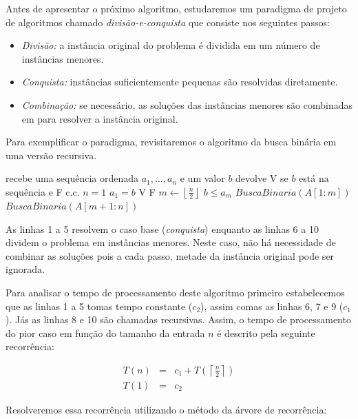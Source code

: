 Antes de apresentar o próximo algoritmo, estudaremos um paradigma de projeto de algoritmos chamado {\em divisão-e-conquista} que consiste nos seguintes passos:

\begin{itemize}
  \item {\em Divisão:} a instância original do problema é dividida em um número de instâncias menores.
  \item {\em Conquista:} instâncias suficientemente pequenas são resolvidas diretamente.
    \item {\em Combinação:} se necessário, as soluções das instâncias menores são combinadas em para resolver a instância original.
\end{itemize}

Para exemplificar o paradigma, revisitaremos o algoritmo da busca binária em uma versão recursiva.

\begin{codebox}
  \li \Comment recebe uma sequência ordenada $a_1, \dots, a_n$ e um valor $b$
  \li \Comment devolve V se $b$ está na sequência e F c.c.
  \li \If $n = 1$
  \li \Then \If $a_1 = b$
  \li \Then \Return V
  \End
  \li \Else
  \li \Return F
  \End 
  \li $m \gets \left \lfloor{\frac{n}{2}}\right\rfloor$
  \li \If $b \leq a_m$
  \li     \Then \Return $BuscaBinaria(A[1:m])$
  \End
  \li \Else \Return $BuscaBinaria(A[m+1:n])$
  \End
\end{codebox}

As linhas 1 a 5 resolvem o caso base ({\em conquista}) enquanto as linhas 6 a 10 dividem o problema em instâncias menores.
Neste caso, não há necessidade de combinar as soluções pois a cada passo, metade da instância original pode ser ignorada.

Para analisar o tempo de processamento deste algoritmo primeiro estabelecemos que as linhas 1 a 5 tomas tempo constante ($c_2$), assim comas as linhas 6, 7 e 9 ($c_1$).
Jás as linhas 8 e 10 são chamadas recursivas.
Assim, o tempo de processamento do pior caso em função do tamanho da entrada $n$ é descrito pela seguinte recorrência:

\begin{eqnarray*}
  T(n) & = & c_1 + T(\left \lceil{\frac{n}{2}}\right \rceil) \\
  T(1) & = & c_2
\end{eqnarray*}

Resolveremos essa recorrência utilizando o método da árvore de recorrência:

